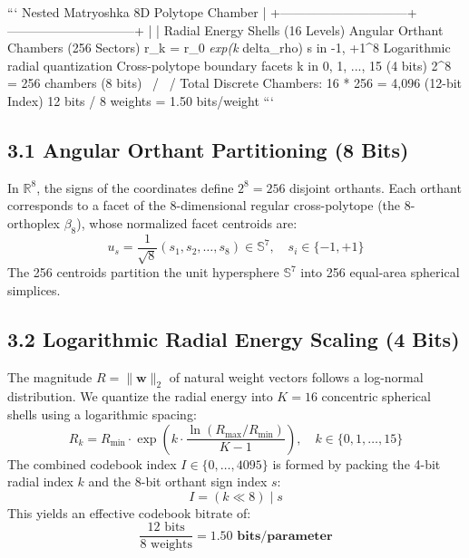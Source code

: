 \documentclass[11pt,twoside,openright]{amsbook}
\begin{document}
{{{{{```
                      Nested Matryoshka 8D Polytope Chamber
                                        |
         +------------------------------+------------------------------+
         |                                                             |
  Radial Energy Shells (16 Levels)                            Angular Orthant Chambers (256 Sectors)
  r_k = r_0 \textit{ exp(k } delta_rho)                              s in {-1, +1}^8
  Logarithmic radial quantization                              Cross-polytope boundary facets
  k in {0, 1, ..., 15} (4 bits)                                2^8 = 256 chambers (8 bits)
                                        \                             /
                                         \                           /
                                      Total Discrete Chambers:
                                      16 * 256 = 4,096 (12-bit Index)
                                      12 bits / 8 weights = 1.50 bits/weight
```

\subsection{3.1 Angular Orthant Partitioning (8 Bits)}

In $\mathbb{R}^8$, the signs of the coordinates define $2^8 = 256$ disjoint orthants. Each orthant corresponds to a facet of the 8-dimensional regular cross-polytope (the 8-orthoplex $\beta_8$), whose normalized facet centroids are:
$$u_s = \frac{1}{\sqrt{8}} (s_1, s_2, \dots, s_8) \in \mathbb{S}^7, \quad s_i \in \{-1, +1\}$$
The 256 centroids partition the unit hypersphere $\mathbb{S}^7$ into 256 equal-area spherical simplices.

\subsection{3.2 Logarithmic Radial Energy Scaling (4 Bits)}

The magnitude $R = \|\mathbf{w}\|_2$ of natural weight vectors follows a log-normal distribution. We quantize the radial energy into $K = 16$ concentric spherical shells using a logarithmic spacing:
$$R_k = R_{\min} \cdot \exp\left( k \cdot \frac{\ln(R_{\max} / R_{\min})}{K - 1} \right), \quad k \in \{0, 1, \dots, 15\}$$
The combined codebook index $I \in \{0, \dots, 4095\}$ is formed by packing the 4-bit radial index $k$ and the 8-bit orthant sign index $s$:
$$I = (k \ll 8) \mid s$$
This yields an effective codebook bitrate of:
$$\frac{12 \text{ bits}}{8 \text{ weights}} = \mathbf{1.50 \text{ bits/parameter}}$$

}}}}}
\end{document}
